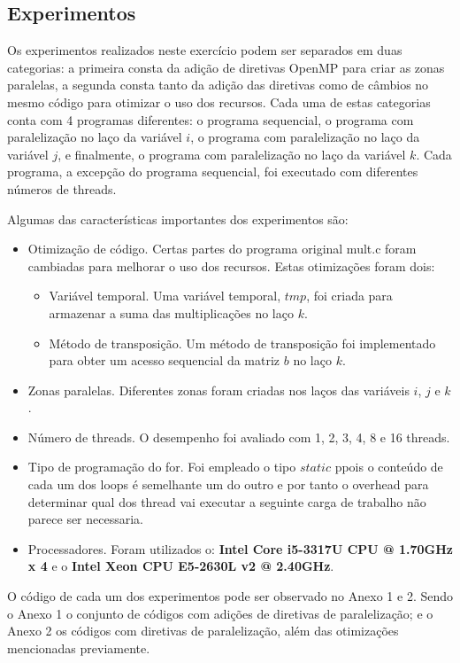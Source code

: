 \documentclass[a4paper,12pt,fleqn]{article}
\begin{document}
\subsection{Experimentos} 
Os experimentos realizados neste exercício podem ser separados em duas categorias: a primeira consta da adição de diretivas OpenMP para criar as zonas paralelas, a segunda consta tanto da adição das  diretivas como de câmbios no mesmo código para otimizar o uso dos recursos. Cada uma de estas categorias conta com 4 programas diferentes: o programa sequencial, o programa com paralelização no laço da variável $i$, o programa com paralelização no laço da variável $j$, e finalmente, o programa com paralelização no laço da variável $k$. Cada programa, a excepção do programa sequencial, foi executado com diferentes números de threads.  
 
Algumas das características importantes dos experimentos são: 
\begin{itemize} 
    \item Otimização de código. Certas partes do programa original mult.c foram cambiadas para melhorar o uso dos recursos. Estas otimizações foram dois: 
    \begin{itemize}
        \item Variável temporal. Uma variável temporal, $tmp$, foi criada para armazenar a suma das multiplicações no laço $k$.
        \item Método de transposição. Um método de transposição foi implementado para obter um acesso sequencial da matriz $b$ no laço $k$.
    \end{itemize}
    \item Zonas paralelas. Diferentes zonas foram criadas nos laços das variáveis $i$, $j$ e $k$.  
    \item Número de threads. O desempenho foi avaliado com 1, 2, 3, 4, 8 e 16 threads.   
    \item Tipo de programação do for. Foi empleado o tipo $static$ ppois o conteúdo de cada um dos loops é semelhante um do outro e por tanto o overhead para determinar qual dos thread vai executar a seguinte carga de trabalho não parece ser necessaria.
    \item Processadores. Foram utilizados o: \textbf{Intel Core i5-3317U CPU @ 1.70GHz x 4} e o \textbf{Intel Xeon CPU E5-2630L v2 @ 2.40GHz}.
\end{itemize} 

O código de cada um dos experimentos pode ser observado no Anexo 1 e 2. Sendo o Anexo 1 o conjunto de códigos com adições de diretivas de paralelização; e o Anexo 2 os códigos com diretivas de paralelização, além das otimizações mencionadas previamente.  
\end{document}
